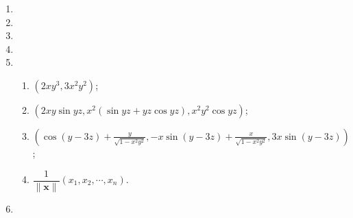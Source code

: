 \documentclass[a4paper, 11pt]{ctexart}
\begin{document}
\begin{enumerate}
    \item %
    \item %
    \item %
    \item %
    \item %
        \begin{enumerate}[(1)]
            \item %
                $(2xy^3, 3x^2y^2)$;
            \item %
                $(2xy\sin{yz}, x^2(\sin{yz}+yz\cos{yz}), x^2y^2\cos{yz})$;
            \item %
                $\displaystyle{
                    \left(
                        \cos(y-3z) + \frac{y}{\sqrt{1-x^2y^2}}, -x\sin(y-3z) + \frac{x}{\sqrt{1-x^2y^2}}, 3x\sin(y-3z)    
                    \right)
                }$;
            \item %
                $\dfrac{1}{\|\boldsymbol{x}\|}(x_1, x_2, \cdots, x_n)$.
        \end{enumerate}
    \item %
\end{enumerate}
\end{document}
